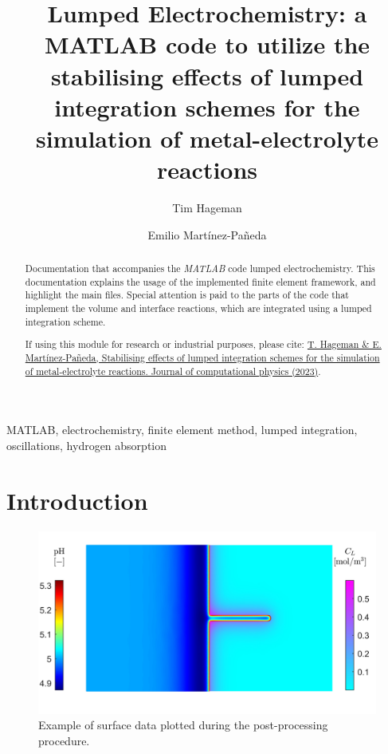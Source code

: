 \documentclass[3p]{elsarticle} %
\newcommand{\citeMe}{\href{DOI HERE}{T. Hageman \& E. Martínez-Pañeda, Stabilising effects of lumped integration schemes for the simulation of metal-electrolyte reactions. Journal of computational physics (2023)}}
\begin{document}
\begin{frontmatter}
\title{Lumped Electrochemistry: a MATLAB code to utilize the stabilising effects of lumped integration schemes for the simulation of metal-electrolyte reactions}

\author{Tim Hageman }
\author{Emilio Martínez-Pañeda}

\address{Department of Civil and Environmental Engineering, Imperial College London, London SW7 2AZ, UK}

\begin{abstract}
Documentation that accompanies the \textit{MATLAB} code lumped electrochemistry. This documentation explains the usage of the implemented finite element framework, and highlight the main files. Special attention is paid to the parts of the code that implement the volume and interface reactions, which are integrated using a lumped integration scheme. 

If using this module for research or industrial purposes, please cite: \citeMe{}.
\end{abstract}

\begin{keyword}
MATLAB, electrochemistry, finite element method, lumped integration, oscillations, hydrogen absorption
\end{keyword}

\end{frontmatter}

\tableofcontents

\section{Introduction}
\begin{figure}
    \centering
    \includegraphics[width=12cm]{../Figures/SurfacePlot.jpg}
    \caption{Example of surface data plotted during the post-processing procedure.}
    \label{fig:example_surf}
\end{figure}
\end{document}
